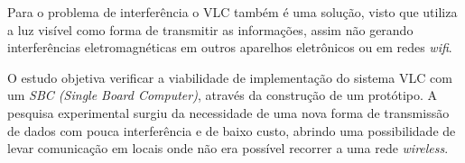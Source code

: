 Para o problema de interferência o VLC também é uma solução, visto que utiliza a luz visível como forma de transmitir as informações, assim não gerando interferências eletromagnéticas em outros aparelhos eletrônicos ou em redes \textit{wifi}.

O estudo objetiva verificar a viabilidade de implementação do sistema VLC com um \textit{SBC (Single Board Computer)}, através da construção de um protótipo. A pesquisa experimental surgiu da necessidade de uma nova forma de transmissão de dados com pouca interferência e de baixo custo, abrindo uma  possibilidade de levar comunicação em locais onde não era possível recorrer a uma rede \textit{wireless}.

